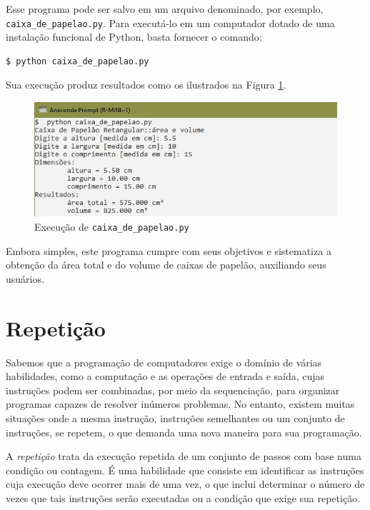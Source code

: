 \documentclass[
]{book}
\begin{document}
Esse programa pode ser salvo em um arquivo denominado, por exemplo, \texttt{caixa\_de\_papelao.py}. Para executá-lo em um computador dotado de uma instalação funcional de Python, basta fornecer o comando:

\begin{verbatim}
$ python caixa_de_papelao.py
\end{verbatim}

Sua execução produz resultados como os ilustrados na Figura \ref{fig:04-04}.

\begin{figure}
\centering
\includegraphics{images/04-04.jpg}
\caption{\label{fig:04-04}Execução de \texttt{caixa\_de\_papelao.py}}
\end{figure}

Embora simples, este programa cumpre com seus objetivos e sistematiza a obtenção da área total e do volume de caixas de papelão, auxiliando seus usuários.

\hypertarget{repet}{%
\chapter{Repetição}\label{repet}}

Sabemos que a programação de computadores exige o domínio de várias habilidades, como a computação e as operações de entrada e saída, cujas instruções podem ser combinadas, por meio da sequenciação, para organizar programas capazes de resolver inúmeros problemas. No entanto, existem muitas situações onde a mesma instrução, instruções semelhantes ou um conjunto de instruções, se repetem, o que demanda uma nova maneira para sua programação.

A \emph{repetição} trata da execução repetida de um conjunto de passos com base numa condição ou contagem. É uma habilidade que consiste em identificar as instruções cuja execução deve ocorrer mais de uma vez, o que inclui determinar o número de vezes que tais instruções serão executadas ou a condição que exige sua repetição.
\end{document}
